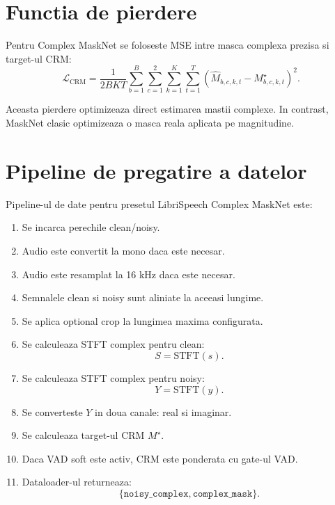 \documentclass[12pt,a4paper]{article}
\begin{document}
\section{Functia de pierdere}

Pentru Complex MaskNet se foloseste MSE intre masca complexa prezisa si target-ul
CRM:
\begin{equation}
    \mathcal{L}_{\mathrm{CRM}} =
    \frac{1}{2BKT}
    \sum_{b=1}^{B}
    \sum_{c=1}^{2}
    \sum_{k=1}^{K}
    \sum_{t=1}^{T}
    \left(
        \hat{M}_{b,c,k,t} - M^{\star}_{b,c,k,t}
    \right)^2.
\end{equation}

Aceasta pierdere optimizeaza direct estimarea mastii complexe. In contrast,
MaskNet clasic optimizeaza o masca reala aplicata pe magnitudine.

\section{Pipeline de pregatire a datelor}

Pipeline-ul de date pentru presetul LibriSpeech Complex MaskNet este:

\begin{enumerate}
    \item Se incarca perechile clean/noisy.
    \item Audio este convertit la mono daca este necesar.
    \item Audio este resamplat la 16 kHz daca este necesar.
    \item Semnalele clean si noisy sunt aliniate la aceeasi lungime.
    \item Se aplica optional crop la lungimea maxima configurata.
    \item Se calculeaza STFT complex pentru clean:
    \begin{equation}
        S = \mathrm{STFT}(s).
    \end{equation}
    \item Se calculeaza STFT complex pentru noisy:
    \begin{equation}
        Y = \mathrm{STFT}(y).
    \end{equation}
    \item Se converteste $Y$ in doua canale: real si imaginar.
    \item Se calculeaza target-ul CRM $M^{\star}$.
    \item Daca VAD soft este activ, CRM este ponderata cu gate-ul VAD.
    \item Dataloader-ul returneaza:
    \begin{equation}
        \{\texttt{noisy\_complex}, \texttt{complex\_mask}\}.
    \end{equation}
\end{enumerate}
\end{document}
